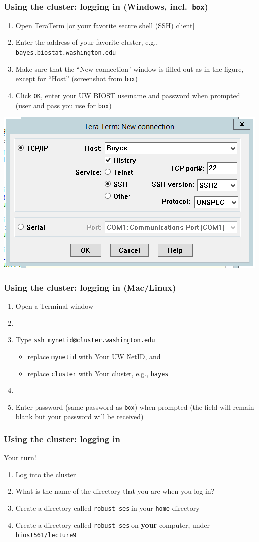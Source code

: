 \documentclass[12pt, 
hyperref={colorlinks=true, linkcolor=BlueViolet, urlcolor=BlueViolet},dvipsnames]{beamer}
\begin{document}
\begin{frame}
\frametitle{Using the cluster: logging in (Windows, incl.~\texttt{box})}
\begin{enumerate}
\item Open TeraTerm [or your favorite secure shell (SSH) client]
\item Enter the address of your favorite cluster, e.g., \texttt{bayes.biostat.washington.edu}
\item Make sure that the ``New connection'' window is filled out as in the figure, except for ``Host'' (screenshot from \texttt{box})
\item Click \texttt{OK}, enter your UW BIOST username and password when prompted (user and pass you use for \texttt{box}) 
\end{enumerate}
\centering
\includegraphics[width = .45\textwidth]{plots/tera_term_example.png}
\end{frame}

\begin{frame}
\frametitle{Using the cluster: logging in (Mac/Linux)}
\begin{enumerate}
\item Open a Terminal window
\item[]
\item Type \texttt{ssh mynetid@cluster.washington.edu}
\begin{itemize}
\item replace \texttt{mynetid} with Your UW NetID, and 
\item replace \texttt{cluster} with Your cluster, e.g., \texttt{bayes}
\end{itemize} 
\item[]
\item Enter password (same password as \texttt{box}) when prompted (the field will remain blank but your password will be received)
\end{enumerate}

\end{frame}

\begin{frame}
\frametitle{Using the cluster: logging in}
Your turn!
\begin{enumerate}
\item Log into the cluster
\item What is the name of the directory that you are when you log in?
\item Create a directory called \texttt{robust\_ses} in your \texttt{home} directory
\item Create a directory called \texttt{robust\_ses} on \textbf{your} computer, under \texttt{biost561/lecture9}
\end{enumerate}
\end{frame}
\end{document}
